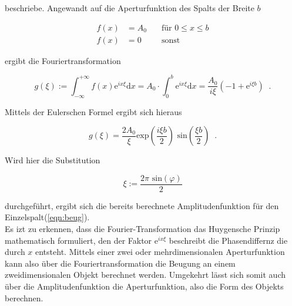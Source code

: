         \noindent beschriebe. Angewandt auf die Aperturfunktion des Spalts der Breite $b$ 

        \begin{align*}
            f(x) & = A_0 \quad & \text{für } 0\leq x \leq b\\
            f(x) & = 0 \quad & \text{sonst}
        \end{align*}

        \noindent ergibt die Fouriertransformation

        \begin{equation*}
            g(\xi) := \int_{-\infty}^{+\infty} f(x) \text{e}^{i x \xi} \text{d} x = A_0 \cdot \int_0^b \text{e}^{i x \xi} \text{d} x =
            \frac{A_0}{i \xi} \left( -1 + \text{e}^{i \xi b} \right) \; \; .
        \end{equation*}

        \noindent Mittels der Eulerschen Formel ergibt sich hieraus 

        \begin{equation*}
            g(\xi) = \frac{2 A_0}{\xi} \text{exp} \left( \frac{i \xi b}{2} \right) \text{ sin} \left( \frac{\xi b}{2} \right)\; \; .
        \end{equation*}

        \noindent Wird hier die Substitution 

        \begin{equation}
            \xi := \frac{2 \pi \text{ sin}(\varphi)}{2} 
        \end{equation}

        \noindent durchgeführt, ergibt sich die bereits berechnete Amplitudenfunktion für den Einzelspalt(\ref{eqn:beug}).\\
        Es izt zu erkennen, dass die Fourier-Transformation das Huygensche Prinzip mathematisch formuliert, den der Faktor 
        $\text{e}^{i x \xi}$ beschreibt die Phasendiffernz die durch $x$ entsteht. Mittels einer zwei oder mehrdimensionalen 
        Aperturfunktion kann also über die Fouriertransformation die Beugung an einem zweidimensionalen Objekt berechnet werden. 
        Umgekehrt lässt sich somit auch über die Amplitudenfunktion die Aperturfunktion, also die Form des Objekts berechnen.


        



    





    